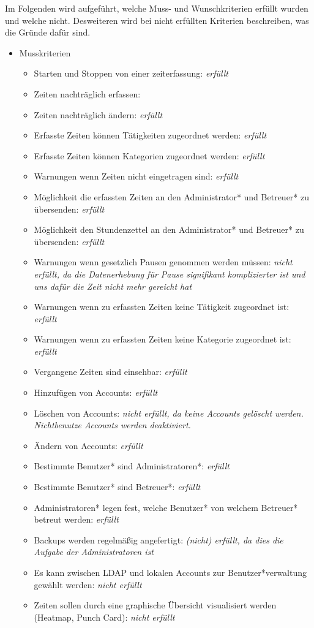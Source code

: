 Im Folgenden wird aufgeführt, welche Muss- und Wunschkriterien erfüllt wurden und welche nicht. Desweiteren wird bei nicht erfüllten Kriterien beschreiben, was die Gründe dafür sind.

\begin{itemize}
  \item Musskriterien
    \begin{itemize}
      \item Starten und Stoppen von einer zeiterfassung: \emph{erfüllt}
      \item Zeiten nachträglich erfassen:  %
      \item Zeiten nachträglich ändern: \emph{erfüllt}
      \item Erfasste Zeiten können Tätigkeiten zugeordnet werden: \emph{erfüllt}
      \item Erfasste Zeiten können Kategorien zugeordnet werden: \emph{erfüllt}
      \item Warnungen wenn Zeiten nicht eingetragen sind: \emph{erfüllt}
      \item Möglichkeit die erfassten Zeiten an den Administrator* und Betreuer* zu übersenden: \emph{erfüllt}
	    \item Möglichkeit den Stundenzettel an den Administrator* und Betreuer* zu übersenden: \emph{erfüllt}
	    \item Warnungen wenn gesetzlich Pausen genommen werden müssen: \emph{nicht erfüllt, da die Datenerhebung für Pause signifikant komplizierter ist und uns dafür die Zeit nicht mehr gereicht hat}
	    \item Warnungen wenn zu erfassten Zeiten keine Tätigkeit zugeordnet ist: \emph{erfüllt}
	    \item Warnungen wenn zu erfassten Zeiten keine Kategorie zugeordnet ist: \emph{erfüllt}
	    \item Vergangene Zeiten sind einsehbar: \emph{erfüllt}
    	\item Hinzufügen von Accounts: \emph{erfüllt}
    	\item Löschen von Accounts: \emph{nicht erfüllt, da keine Accounts gelöscht werden. Nichtbenutze Accounts werden deaktiviert.}
    	\item Ändern von Accounts: \emph{erfüllt}
    	\item Bestimmte Benutzer* sind Administratoren*: \emph{erfüllt}
    	\item Bestimmte Benutzer* sind Betreuer*: \emph{erfüllt}
    	\item Administratoren* legen fest, welche Benutzer* von welchem Betreuer* betreut werden: \emph{erfüllt}
    	\item Backups werden regelmäßig angefertigt: \emph{(nicht) erfüllt, da dies die Aufgabe der Administratoren ist}
    	\item Es kann zwischen LDAP und lokalen Accounts zur Benutzer*verwaltung gewählt werden: \emph{nicht erfüllt}
    	\item Zeiten sollen durch eine graphische Übersicht visualisiert werden (Heatmap, Punch Card): \emph{nicht erfüllt}
    \end{itemize}
    

\end{itemize}
